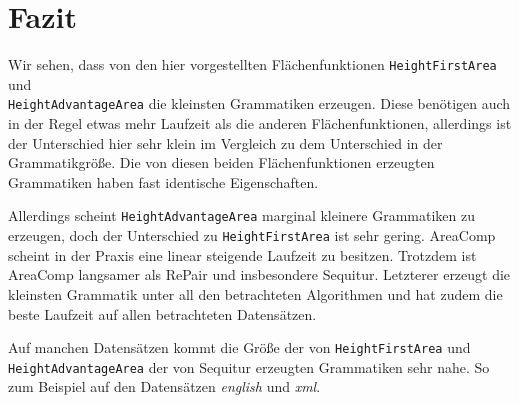 \section{Fazit}

Wir sehen, dass von den hier vorgestellten Flächenfunktionen \texttt{HeightFirstArea} und\\
\texttt{HeightAdvantageArea} die kleinsten Grammatiken erzeugen. Diese benötigen auch in der Regel etwas mehr Laufzeit als die anderen Flächenfunktionen, allerdings ist der Unterschied hier sehr klein im Vergleich zu dem Unterschied in der Grammatikgröße. Die von diesen beiden Flächenfunktionen erzeugten Grammatiken haben fast identische Eigenschaften.

Allerdings scheint \texttt{HeightAdvantageArea} marginal kleinere Grammatiken zu erzeugen, doch der Unterschied zu \texttt{HeightFirstArea} ist sehr gering. AreaComp scheint in der Praxis eine linear steigende Laufzeit zu besitzen. Trotzdem ist AreaComp langsamer als RePair und insbesondere Sequitur. Letzterer erzeugt die kleinsten Grammatik unter all den betrachteten Algorithmen und hat zudem die beste Laufzeit auf allen betrachteten Datensätzen.

Auf manchen Datensätzen kommt die Größe der von \texttt{HeightFirstArea} und\\
\texttt{HeightAdvantageArea} der von Sequitur erzeugten Grammatiken sehr nahe. So zum Beispiel auf den Datensätzen \emph{english} und \emph{xml}.